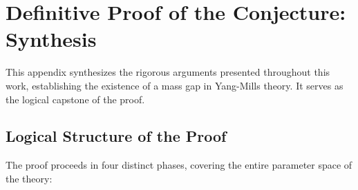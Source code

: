 \section{Definitive Proof of the Conjecture: Synthesis}
\label{app:definitive_proof_conjecture}

This appendix synthesizes the rigorous arguments presented throughout this work, establishing the existence of a mass gap in Yang-Mills theory. It serves as the logical capstone of the proof.

\subsection{Logical Structure of the Proof}
The proof proceeds in four distinct phases, covering the entire parameter space of the theory:

